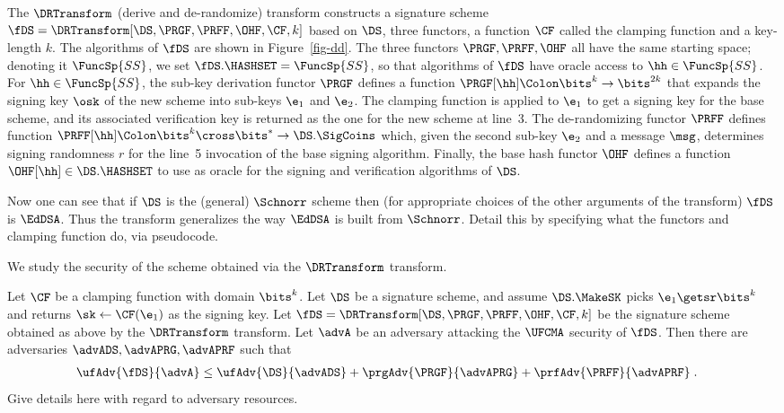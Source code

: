 The $\DRTransform$ (derive and de-randomize) transform constructs a signature scheme $\fDS = \DRTransform[\DS,\PRGF,\PRFF,\OHF,\CF,k]$ based on $\DS$, three functors, a function $\CF$ called the clamping function and a key-length $k$. The algorithms of $\fDS$ are shown in Figure~\ref{fig-dd}. The three functors $\PRGF,\PRFF,\OHF$ all have the same starting space; denoting it $\FuncSp{SS}$, we set $\fDS.\HASHSET = \FuncSp{SS}$, so that algorithms of $\fDS$ have oracle access to $\hh\in\FuncSp{SS}$. For $\hh\in\FuncSp{SS}$, the sub-key derivation functor $\PRGF$ defines a function $\PRGF[\hh]\Colon\bits^k\to\bits^{2k}$ that expands the signing key $\osk$ of the new scheme into sub-keys $\e_1$ and $\e_2$. The clamping function is applied to $\e_1$ to get a signing key for the base scheme, and its associated verification key is returned as the one for the new scheme at line~3. The de-randomizing functor $\PRFF$ defines function $\PRFF[\hh]\Colon\bits^k\cross\bits^*\to\DS.\SigCoins$ which, given the second sub-key $\e_2$ and a message $\msg$, determines signing randomness $r$ for the line~5 invocation of the base signing algorithm. Finally, the base hash functor $\OHF$ defines a function $\OHF[\hh]\in\DS.\HASHSET$ to use as oracle for the signing and verification algorithms of $\DS$. 

 Now one can see that if $\DS$ is the (general) $\Schnorr$ scheme then (for appropriate choices of the other arguments of the transform) $\fDS$ is $\EdDSA$. Thus the transform generalizes the way $\EdDSA$ is built from $\Schnorr$. Detail this by specifying what the functors and clamping function do, via pseudocode. 

 We study the security of the scheme obtained via the $\DRTransform$ transform.



\begin{theorem}\label{th-dd} Let $\CF$ be a clamping function with domain $\bits^k$. Let $\DS$ be a signature scheme, and assume $\DS.\MakeSK$ picks $\e_1\getsr\bits^k$ and returns $\sk\gets\CF(\e_1)$ as the signing key. Let $\fDS = \DRTransform[\DS,\PRGF,\PRFF,\OHF,\CF,k]$ be the signature scheme obtained as above by the $\DRTransform$ transform. Let $\advA$ be an adversary attacking the $\UFCMA$ security of $\fDS$. Then there are adversaries $\advADS,\advAPRG,\advAPRF$ such that
\begin{align*}
	\ufAdv{\fDS}{\advA} &\leq   \ufAdv{\DS}{\advADS} + \prgAdv{\PRGF}{\advAPRG} + \prfAdv{\PRFF}{\advAPRF}\;.
\end{align*}
Give details here with regard to adversary resources.
	
\end{theorem}

